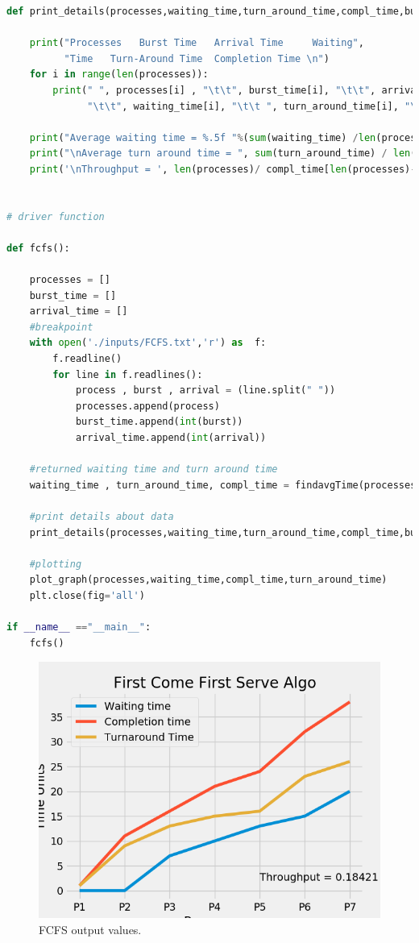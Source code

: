 \documentclass[11pt,a4paper]{report}
\begin{document}
\begin{lstlisting}[language=Python,caption=fcfs source code,breaklines=true,postbreak=\mbox{\textcolor{red}{$\hookrightarrow$}\space},]
def print_details(processes,waiting_time,turn_around_time,compl_time,burst_time,arrival_time):
      
    print("Processes   Burst Time   Arrival Time     Waiting",  
          "Time   Turn-Around Time  Completion Time \n") 
    for i in range(len(processes)):
        print(" ", processes[i] , "\t\t", burst_time[i], "\t\t", arrival_time[i],  
              "\t\t", waiting_time[i], "\t\t ", turn_around_time[i], "\t\t ", compl_time[i])  
  
    print("Average waiting time = %.5f "%(sum(waiting_time) /len(processes))) 
    print("\nAverage turn around time = ", sum(turn_around_time) / len(processes))  
    print('\nThroughput = ', len(processes)/ compl_time[len(processes)-1])


# driver function

def fcfs():
 
    processes = []
    burst_time = []
    arrival_time = []
    #breakpoint
    with open('./inputs/FCFS.txt','r') as  f:
        f.readline()
        for line in f.readlines():
            process , burst , arrival = (line.split(" "))
            processes.append(process)
            burst_time.append(int(burst))
            arrival_time.append(int(arrival))

    #returned waiting time and turn around time
    waiting_time , turn_around_time, compl_time = findavgTime(processes,  burst_time, arrival_time)
    
    #print details about data
    print_details(processes,waiting_time,turn_around_time,compl_time,burst_time,arrival_time)

    #plotting 
    plot_graph(processes,waiting_time,compl_time,turn_around_time)
    plt.close(fig='all')

if __name__ =="__main__": 
    fcfs()
\end{lstlisting}

\begin{figure}[H]
	\centering
	\includegraphics[scale=0.8]{./img/FCFS_output.png}
	\caption{FCFS output values.}
\end{figure}
\end{document}
